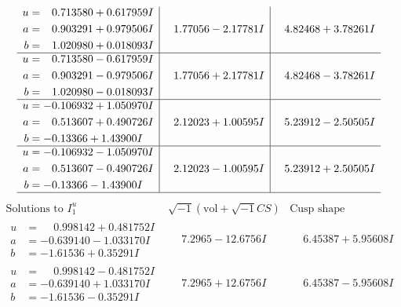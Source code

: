 \documentclass[1p]{elsarticle_modified}
\theoremstyle{definition}
\newcommand{\I}{\sqrt{-1}}
\begin{document}
$$\begin{array}{c|c|c}
\begin{aligned}
u &= \phantom{-}0.713580 + 0.617959 I \\
a &= \phantom{-}0.903291 + 0.979506 I \\
b &= \phantom{-}1.020980 + 0.018093 I\end{aligned}
 & \phantom{-}1.77056 - 2.17781 I & \phantom{-}4.82468 + 3.78261 I \\ \hline\begin{aligned}
u &= \phantom{-}0.713580 - 0.617959 I \\
a &= \phantom{-}0.903291 - 0.979506 I \\
b &= \phantom{-}1.020980 - 0.018093 I\end{aligned}
 & \phantom{-}1.77056 + 2.17781 I & \phantom{-}4.82468 - 3.78261 I \\ \hline\begin{aligned}
u &= -0.106932 + 1.050970 I \\
a &= \phantom{-}0.513607 + 0.490726 I \\
b &= -0.13366 + 1.43900 I\end{aligned}
 & \phantom{-}2.12023 + 1.00595 I & \phantom{-}5.23912 - 2.50505 I \\ \hline\begin{aligned}
u &= -0.106932 - 1.050970 I \\
a &= \phantom{-}0.513607 - 0.490726 I \\
b &= -0.13366 - 1.43900 I\end{aligned}
 & \phantom{-}2.12023 - 1.00595 I & \phantom{-}5.23912 + 2.50505 I\\
 \hline 
 \end{array}$$\newpage$$\begin{array}{c|c|c}  
\text{Solutions to }I^u_{1}& \I (\text{vol} + \sqrt{-1}CS) & \text{Cusp shape}\\
 \hline 
\begin{aligned}
u &= \phantom{-}0.998142 + 0.481752 I \\
a &= -0.639140 - 1.033170 I \\
b &= -1.61536 + 0.35291 I\end{aligned}
 & \phantom{-}7.2965 - 12.6756 I & \phantom{-}6.45387 + 5.95608 I \\ \hline\begin{aligned}
u &= \phantom{-}0.998142 - 0.481752 I \\
a &= -0.639140 + 1.033170 I \\
b &= -1.61536 - 0.35291 I\end{aligned}
 & \phantom{-}7.2965 + 12.6756 I & \phantom{-}6.45387 - 5.95608 I \\ \hline\begin{aligned}

\end{aligned}
\end{array}$$
\end{document}
